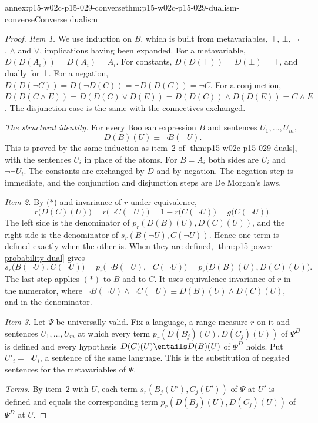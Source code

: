\begin{annexitem}{annex:p15-w02c-p15-029-converse}{thm:p15-w02c-p15-029-dualism-converse}{Converse dualism}
\begin{proof}
\emph{Item 1.} We use induction on \(B\), which is built from
metavariables, \(\top\), \(\bot\), \(\neg\), \(\land\) and \(\lor\),
implications having been expanded. For a metavariable,
\(D(D(A_i))=D(A_i)=A_i\). For constants,
\(D(D(\top))=D(\bot)=\top\), and dually for \(\bot\). For a negation,
\(D(D(\neg C))=D(\neg D(C))=\neg D(D(C))=\neg C\). For a conjunction,
\(D(D(C\land E))=D(D(C)\lor D(E))=D(D(C))\land D(D(E))=C\land E\). The
disjunction case is the same with the connectives exchanged.

\emph{The structural identity.} For every Boolean expression \(B\) and
sentences \(U_1,\ldots,U_m\),
\[
 D(B)(U)\equiv\neg B(\neg U). \tag{\(\ast\)}
\]
This is proved by the same induction as item~2 of
\cref{thm:p15-w02c-p15-029-duals}, with the sentences \(U_i\) in place of
the atoms. For \(B=A_i\) both sides are \(U_i\) and \(\neg\neg U_i\).
The constants are exchanged by \(D\) and by negation. The negation step
is immediate, and the conjunction and disjunction steps are De Morgan's
laws.

\emph{Item 2.} By \((\ast\)) and invariance of \(r\) under equivalence,
\[
 r\bigl(D(C)(U)\bigr)=r\bigl(\neg C(\neg U)\bigr)
 =1-r\bigl(C(\neg U)\bigr)=g\bigl(C(\neg U)\bigr).
\]
The left side is the denominator of
\(p_r(D(B)(U),D(C)(U))\), and the right side is the denominator of
\(s_r(B(\neg U),C(\neg U))\). Hence one term is defined exactly when the
other is. When they are defined, \cref{thm:p15-power-probability-dual}
gives
\[
 s_r\bigl(B(\neg U),C(\neg U)\bigr)
 =p_r\bigl(\neg B(\neg U),\neg C(\neg U)\bigr)
 =p_r\bigl(D(B)(U),D(C)(U)\bigr).
\]
The last step applies \((\ast)\) to \(B\) and to \(C\). It uses
equivalence invariance of \(r\) in the numerator, where
\(\neg B(\neg U)\land\neg C(\neg U)\equiv D(B)(U)\land D(C)(U)\), and in
the denominator.

\emph{Item 3.} Let \(\Psi\) be universally valid. Fix a language, a range
measure \(r\) on it and sentences \(U_1,\ldots,U_m\) at which every term
\(p_r(D(B_j)(U),D(C_j)(U))\) of \(\Psi^D\) is defined and every
hypothesis \(D(C)(U)\entails D(B)(U)\) of \(\Psi^D\) holds. Put
\(U'_i=\neg U_i\), a sentence of the same language. This is the
substitution of negated sentences for the metavariables of \(\Psi\).

\emph{Terms.} By item~2 with \(U\), each term
\(s_r(B_j(U'),C_j(U'))\) of \(\Psi\) at \(U'\) is defined and equals the
corresponding term \(p_r(D(B_j)(U),D(C_j)(U))\) of \(\Psi^D\) at \(U\).


\end{proof}
\end{annexitem}
